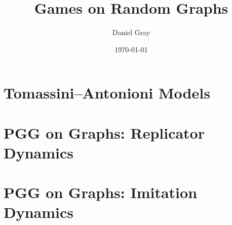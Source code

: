 \documentclass[12pt,twoside]{report}
\title{Games on Random Graphs}
\author{Daniel Gray}
\date{\today}
\begin{document}


%




\tableofcontents




%
\chapter{Tomassini--Antonioni Models} \label{TA}


\chapter{PGG on Graphs: Replicator Dynamics} 
\label{Chapter:Rep}

\chapter{PGG on Graphs: Imitation Dynamics} 
\label{Chapter:ID}


\label{CA}
%

%

\appendix
%

\printbibliography
\end{document}
